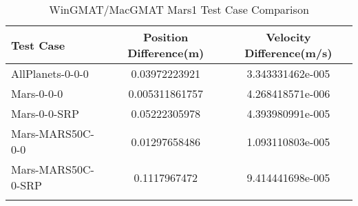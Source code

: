 \begin{table}[htbp!]
\centering
\caption{ WinGMAT/MacGMAT Mars1 Test Case Comparison}
      \begin{tabular}{lcc}
      \hline\hline
          Test Case & Position Difference(m) & Velocity Difference(m/s) \\
         \hline
         AllPlanets-0-0-0 & 0.03972223921 & 3.343331462e-005 \\
         Mars-0-0-0 & 0.005311861757 & 4.268418571e-006 \\
         Mars-0-0-SRP & 0.05222305978 & 4.393980991e-005 \\
         Mars-MARS50C-0-0 & 0.01297658486 & 1.093110803e-005 \\
         Mars-MARS50C-0-SRP & 0.1117967472 & 9.414441698e-005 \\
      \hline\hline
      \label{Table: Mars1 WinGMAT-MacGMAT Table} 
\end{tabular}
\end{table}
